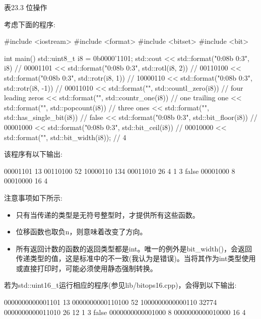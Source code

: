 \begin{center}
表23.3 位操作
\end{center}

考虑下面的程序:


\begin{cpp}
#include <iostream>
#include <format>
#include <bitset>
#include <bit>

int main()
{
	std::uint8_t i8 = 0b0000'1101;
	std::cout
		<< std::format("{0:08b} {0:3}\n", i8) // 00001101
		<< std::format("{0:08b} {0:3}\n", std::rotl(i8, 2)) // 00110100
		<< std::format("{0:08b} {0:3}\n", std::rotr(i8, 1)) // 10000110
		<< std::format("{0:08b} {0:3}\n", std::rotr(i8, -1)) // 00011010
		<< std::format("{}\n", std::countl_zero(i8)) // four leading zeros
		<< std::format("{}\n", std::countr_one(i8)) // one trailing one
		<< std::format("{}\n", std::popcount(i8)) // three ones
		<< std::format("{}\n", std::has_single_bit(i8)) // false
		<< std::format("{0:08b} {0:3}\n", std::bit_floor(i8)) // 00001000
		<< std::format("{0:08b} {0:3}\n", std::bit_ceil(i8)) // 00010000
		<< std::format("{}\n", std::bit_width(i8)); // 4
}
\end{cpp}

该程序有以下输出:

\begin{shell}
00001101  13
00110100  52
10000110 134
00011010  26
4 
1 
3
false
00001000  8
00010000 16
4
\end{shell}

注意事项如下所示:

\begin{itemize}
\item 
只有当传递的类型是无符号整型时，才提供所有这些函数。

\item 
位移函数也取负n，则意味着改变了方向。

\item 
所有返回计数的函数的返回类型都是int。唯一的例外是bit\_width()，会返回传递类型的值，这是标准中的不一致(我认为是错误)。当将其作为int类型使用或直接打印时，可能必须使用静态强制转换。
\end{itemize}

若为std::uint16\_t运行相应的程序(参见lib/bitops16.cpp)，会得到以下输出:

\begin{shell}
0000000000001101    13
0000000000110100    52
1000000000000110 32774
0000000000011010    26
12
1 
3
false
0000000000001000     8
0000000000010000    16
4
\end{shell}

